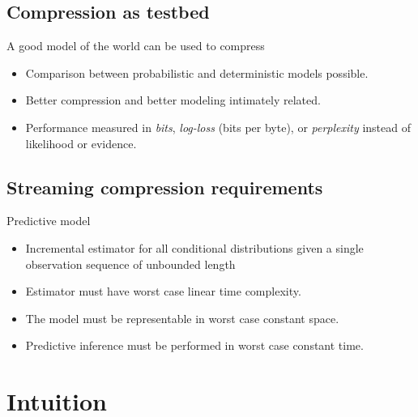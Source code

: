 \documentclass[16pt]{beamer}
\begin{document}
\subsection{Compression as testbed}
\begin{frame}[t]{}
A good model of the world can be used to compress 
\begin{itemize}
\item Comparison between probabilistic and deterministic models possible.
\item Better compression and better modeling intimately related.
\item Performance measured in {\em bits}, {\em log-loss} (bits per byte), or {\em perplexity} instead of likelihood or evidence.
\end{itemize}


\subsection{Streaming compression requirements}
\begin{frame}[t]{}
Predictive model
\begin{itemize}
\item Incremental estimator for all conditional distributions given a single observation sequence of unbounded length
\item Estimator must have worst case linear time complexity.
\item The model must be representable in worst case constant space.
\item Predictive inference must be performed in worst case constant time.
\end{itemize}


\end{frame}	

\section{Intuition}

\end{frame}
\end{document}
